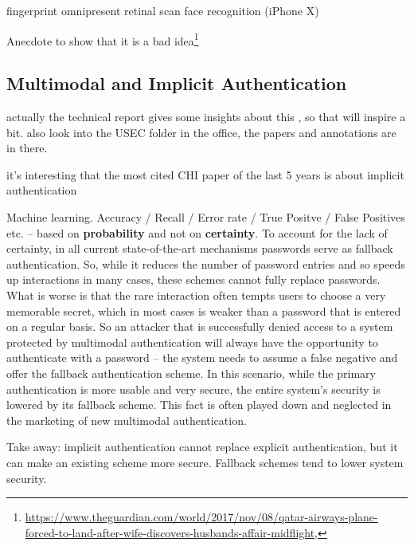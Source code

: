 	\cite{Jakobsson2014HowToWearYourPW,DeLuca2012TouchMeOnce,Peisert2013PriciplesAuthentication,Rybnicek2014RoadmapContinuousAuth}
	

	fingerprint omnipresent 
	retinal scan
	face recognition (iPhone X)
	
	
	Anecdote to show that it is a bad idea\footnote{\url{https://www.theguardian.com/world/2017/nov/08/qatar-airways-plane-forced-to-land-after-wife-discovers-husbands-affair-midflight}, }
	
	\subsection{Multimodal and Implicit Authentication}
	
	actually the technical report gives some insights about this \cite{Stockinger2011ImplicitAuthentication}, so that will inspire a bit.
	also look into the USEC folder in the office, the papers and annotations are in there.
	
		it's interesting that the most cited CHI paper of the last 5 years is about implicit authentication \cite{DeLuca2012TouchMeOnce}
		
		\cite{Roalter2013SmartphoneProxy}
	
	Machine learning. Accuracy / Recall / Error rate / True Positve / False Positives etc. -- based on \textbf{probability} and not on \textbf{certainty}. To account for the lack of certainty, in all current state-of-the-art mechanisms passwords serve as fallback authentication. So, while it reduces the number of password entries and so speeds up interactions in many cases, these schemes cannot fully replace passwords. What is worse is that the rare interaction often tempts users to choose a very memorable secret, which in most cases is weaker than a password that is entered on a regular basis. So an attacker that is successfully denied access to a system protected by multimodal authentication will always have the opportunity to authenticate with a password -- the system needs to assume a false negative and offer the fallback authentication scheme. In this scenario, while the primary authentication is more usable and very secure, the entire system's security is lowered by its fallback scheme. This fact is often played down and neglected in the marketing of new multimodal authentication. 
	
	Take away: implicit authentication cannot replace explicit authentication, but it can make an existing scheme more secure. Fallback schemes tend to lower system security. 
	

